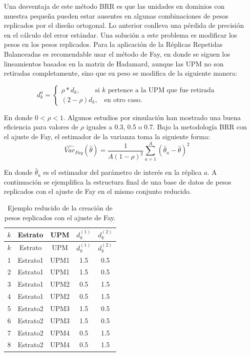 \documentclass[
  12pt,
]{book}
\begin{document}
Una desventaja de este método BRR es que las unidades en dominios con muestra pequeña pueden estar ausentes en algunas combinaciones de pesos replicados por el diseño ortogonal. Lo anterior conlleva una pérdida de precisión en el cálculo del error estándar. Una solución a este problema es modificar los pesos en los pesos replicados. Para la aplicación de la Réplicas Repetidas Balanceadas es recomendable usar el método de Fay, en donde se siguen los lineamientos basados en la matriz de Hadamard, aunque las UPM no son retiradas completamente, sino que su peso se modifica de la siguiente manera:

\[
d_k^a=
\begin{cases}
\rho*d_k,\ \ \ \  \ \ \ \ \ \ \text{si $k$ pertence a la UPM que fue retirada} \\
(2-\rho)d_k, \ \ \ \ \text{en otro caso.}
\end{cases}
\]

En donde \(0<\rho<1\). Algunos estudios por simulación han mostrado una buena eficiencia para valores de \(\rho\) iguales a 0.3, 0.5 o 0.7. Bajo la metodología BRR con el ajuste de Fay, el estimador de la varianza toma la siguiente forma:
\[
\widehat{Var}_{Fay}(\hat{\theta}) = \frac{1}{A(1-\rho)^2}\sum_{a=1}^A(\hat{\theta}_a - \hat\theta )^2
\]

En donde \(\hat{\theta}_a\) es el estimador del parámetro de interés en la réplica \(a\). A continuación se ejemplifica la estructura final de una base de datos de pesos replicados con el ajuste de Fay en el mismo conjunto reducido.

\begin{longtable}[]{@{}ccccc@{}}
\caption{Ejemplo reducido de la creación de pesos replicados con el ajuste de Fay.}\tabularnewline
\toprule()
\(k\) & Estrato & UPM & \(d_k^{(1)}\) & \(d_k^{(2)}\) \\
\midrule()
\endfirsthead
\toprule()
\(k\) & Estrato & UPM & \(d_k^{(1)}\) & \(d_k^{(2)}\) \\
\midrule()
\endhead
1 & Estrato1 & UPM1 & 1.5 & 0.5 \\
2 & Estrato1 & UPM1 & 1.5 & 0.5 \\
3 & Estrato1 & UPM2 & 0.5 & 1.5 \\
4 & Estrato1 & UPM2 & 0.5 & 1.5 \\
5 & Estrato2 & UPM3 & 1.5 & 0.5 \\
6 & Estrato2 & UPM3 & 1.5 & 0.5 \\
7 & Estrato2 & UPM4 & 0.5 & 1.5 \\
8 & Estrato2 & UPM4 & 0.5 & 1.5 \\
\bottomrule()
\end{longtable}
\end{document}

